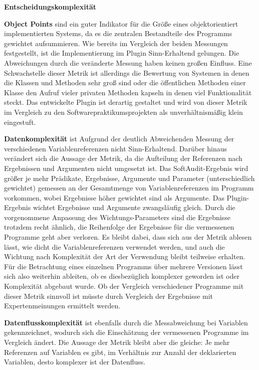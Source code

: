 \documentclass[gb,ngerman]{stthesis}
\begin{document}
			\begin{labeling}{\textbf{Entscheidungskomplexität}}
				\item [\textbf{Object Points}] sind ein guter Indikator für die Größe eines objektorientiert implementierten Systems, da es die zentralen Bestandteile des Programms gewichtet aufsummieren. Wie bereits im Vergleich der beiden Messungen festgestellt, ist die Implementierung im Plugin Sinn-Erhaltend gelungen. Die Abweichungen durch die veränderte Messung haben keinen großen Einfluss. Eine Schwachstelle dieser Metrik ist allerdings die Bewertung von Systemen in denen die Klassen und Methoden sehr groß sind oder die öffentlichen Methoden einer Klasse den Aufruf vieler privaten Methoden kapseln in denen viel Funktionalität steckt. Das entwickelte Plugin ist derartig gestaltet und wird von dieser Metrik im Vergleich zu den Softwarepraktikumsprojekten als unverhältnismäßig klein eingestuft.
				\item[\textbf{Datenkomplexität}] ist Aufgrund der deutlich Abweichenden Messung der verschiedenen Variablenreferenzen nicht Sinn-Erhaltend. Darüber hinaus verändert sich die Aussage der Metrik, da die Aufteilung der Referenzen nach Ergebnissen und Argumenten nicht umgesetzt ist. Das SoftAudit-Ergebnis wird größer je mehr Prädikate, Ergebnisse, Argumente und Parameter (unterschiedlich gewichtet) gemessen an der Gesamtmenge von Variablenreferenzen im Programm vorkommen, wobei Ergebnisse höher gewichtet sind als Argumente. Das Plugin-Ergebnis wichtet Ergebnisse und Argumente zwangsläufig gleich. Durch die vorgenommene Anpassung des Wichtungs-Parameters sind die Ergebnisse trotzdem recht ähnlich, die Reihenfolge der Ergebnisse für die vermessenen Programme geht aber verloren. Es bleibt dabei, dass sich aus der Metrik ablesen lässt, wie dicht die Variablenreferenzen verwendet werden, und auch  die Wichtung nach Komplexität der Art der Verwendung bleibt teilweise erhalten. Für die Betrachtung eines einzelnen Programms über mehrere Versionen lässt sich also weiterhin ableiten, ob es diesbezüglich komplexer geworden ist oder Komplexität abgebaut wurde. Ob der Vergleich verschiedener Programme mit dieser Metrik sinnvoll ist müsste durch Vergleich der Ergebnisse mit Expertenmeinungen ermittelt werden.
				\item[\textbf{Datenflusskomplexität}] ist ebenfalls durch die Messabweichung bei Variablen gekennzeichnet, wodurch sich die Einschätzung der vermessenen Programme im Vergleich ändert. Die Aussage der Metrik bleibt aber die gleiche: Je mehr Referenzen auf Variablen es gibt, im Verhältnis zur Anzahl der deklarierten Variablen, desto komplexer ist der Datenfluss.

\end{labeling}
\end{document}
